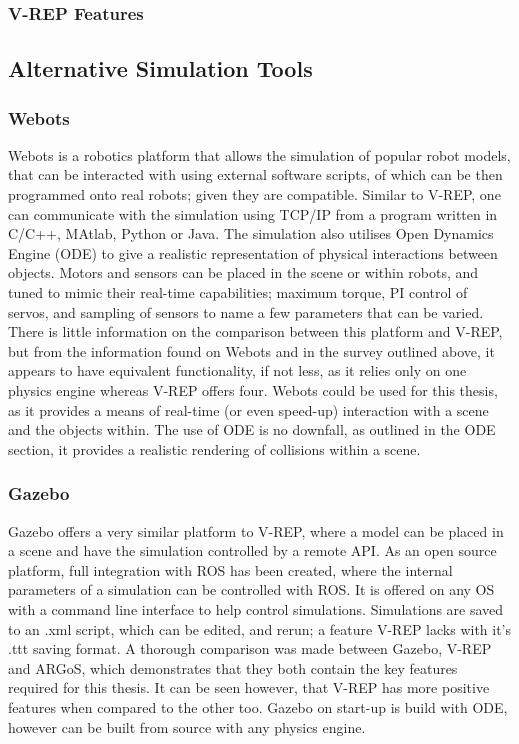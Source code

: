\documentclass[12pt,openany,a4paper]{book}
\begin{document}
\subsubsection{V-REP Features}






\subsection{Alternative Simulation Tools}

\subsubsection{Webots}
Webots is a robotics platform that allows the simulation of popular robot models, that can be interacted with using external software scripts, of which can be then programmed onto real robots; given they are compatible. Similar to V-REP, one can communicate with the simulation using TCP/IP from a program written in C/C++, MAtlab, Python or Java. The simulation also utilises Open Dynamics Engine (ODE) to give a realistic representation of physical interactions between objects. Motors and sensors can be placed in the scene or within robots, and tuned to mimic their real-time capabilities; maximum torque, PI control of servos, and sampling of sensors to name a few parameters that can be varied. There is little information on the comparison between this platform and V-REP, but from the information found on Webots and in the survey outlined above, it appears to have equivalent functionality, if not less, as it relies only on one physics engine whereas V-REP offers four.
Webots could be used for this thesis, as it provides a means of real-time (or even speed-up) interaction with a scene and the objects within. The use of ODE is no downfall, as outlined in the ODE section, it provides a realistic rendering of collisions within a scene.

\subsubsection{Gazebo}
Gazebo offers a very similar platform to V-REP, where a model can be placed in a scene and have the simulation controlled by a remote API. As an open source platform, full integration with ROS has been created, where the internal parameters of a simulation can be controlled with ROS. It is offered on any OS with a command line interface to help control simulations. Simulations are saved to an .xml script, which can be edited, and rerun; a feature V-REP lacks with it's .ttt saving format. A thorough comparison was made between Gazebo, V-REP and ARGoS, which demonstrates that they both contain the key features required for this thesis. It can be seen however, that V-REP has more positive features when compared to the other too. Gazebo on start-up is build with ODE, however can be built from source with any physics engine.
\end{document}
